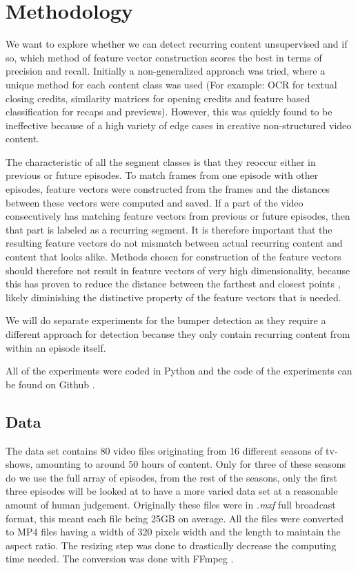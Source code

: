 \documentclass{article}
\begin{document}
\section{Methodology} \label{methodology}
We want to explore whether we can detect recurring content unsupervised and if so, which method of feature vector construction scores the best in terms of precision and recall. Initially a non-generalized approach was tried, where a unique method for each content class was used (For example: OCR for textual closing credits, similarity matrices for opening credits and feature based classification for recaps and previews). However, this was quickly found to be ineffective because of a high variety of edge cases in creative non-structured video content. 

The characteristic of all the segment classes is that they reoccur either in previous or future episodes. To match frames from one episode with other episodes, feature vectors were constructed from the frames and the distances between these vectors were computed and saved. If a part of the video consecutively has matching feature vectors from previous or future episodes, then that part is labeled as a recurring segment. It is therefore important that the resulting feature vectors do not mismatch between actual recurring content and content that looks alike. Methods chosen for construction of the feature vectors should therefore not result in feature vectors of very high dimensionality, because this has proven to reduce the distance between the farthest and closest points \cite{beyer1999nearest}, likely diminishing the distinctive property of the feature vectors that is needed.

We will do separate experiments for the bumper detection as they require a different approach for detection because they only contain recurring content from within an episode itself.

All of the experiments were coded in Python and the code of the experiments can be found on Github \cite{own-github}.
\subsection{Data}
The data set contains 80 video files originating from 16 different seasons of tv-shows, amounting to around 50 hours of content. Only for three of these seasons do we use the full array of episodes, from the rest of the seasons, only the first three episodes will be looked at to have a more varied data set at a reasonable amount of human judgement. Originally these files were in \textit{.mxf} full broadcast format, this meant each file being 25GB on average. All the files were converted to MP4 files having a width of 320 pixels width and the length to maintain the aspect ratio. The resizing step was done to drastically decrease the computing time needed. The conversion was done with FFmpeg \cite{ffmpeg}.
\end{document}
